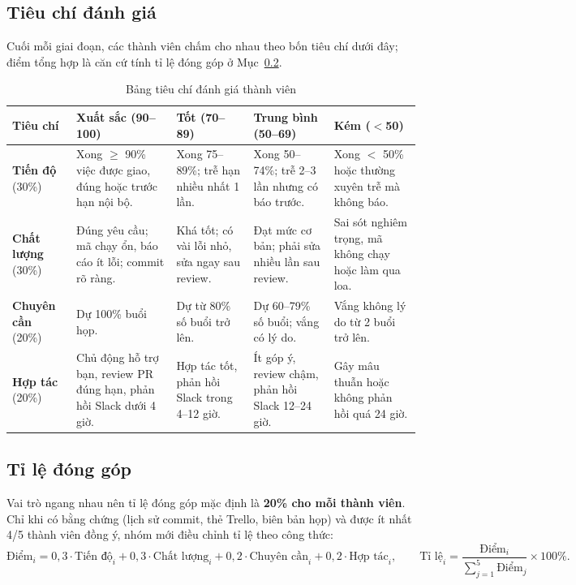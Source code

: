 \documentclass[13pt,a4paper]{extarticle}
\begin{document}
\subsection{Tiêu chí đánh giá}
Cuối mỗi giai đoạn, các thành viên chấm cho nhau theo bốn tiêu chí dưới đây; điểm tổng hợp là căn cứ tính tỉ lệ đóng góp ở Mục~\ref{sec:tile}.

\begin{table}[H]
\centering\footnotesize
\begin{tabularx}{\linewidth}{@{}p{2.1cm} X X X X@{}}
\toprule
\textbf{Tiêu chí} & \textbf{Xuất sắc (90--100)} & \textbf{Tốt (70--89)} & \textbf{Trung bình (50--69)} & \textbf{Kém ($<$50)}\\
\midrule
\textbf{Tiến độ} (30\%) &
Xong $\ge$ 90\% việc được giao, đúng hoặc trước hạn nội bộ. &
Xong 75--89\%; trễ hạn nhiều nhất 1 lần. &
Xong 50--74\%; trễ 2--3 lần nhưng có báo trước. &
Xong $<$ 50\% hoặc thường xuyên trễ mà không báo.\\
\textbf{Chất lượng} (30\%) &
Đúng yêu cầu; mã chạy ổn, báo cáo ít lỗi; commit rõ ràng. &
Khá tốt; có vài lỗi nhỏ, sửa ngay sau review. &
Đạt mức cơ bản; phải sửa nhiều lần sau review. &
Sai sót nghiêm trọng, mã không chạy hoặc làm qua loa.\\
\textbf{Chuyên cần} (20\%) &
Dự 100\% buổi họp. &
Dự từ 80\% số buổi trở lên. &
Dự 60--79\% số buổi; vắng có lý do. &
Vắng không lý do từ 2 buổi trở lên.\\
\textbf{Hợp tác} (20\%) &
Chủ động hỗ trợ bạn, review PR đúng hạn, phản hồi Slack dưới 4 giờ. &
Hợp tác tốt, phản hồi Slack trong 4--12 giờ. &
Ít góp ý, review chậm, phản hồi Slack 12--24 giờ. &
Gây mâu thuẫn hoặc không phản hồi quá 24 giờ.\\
\bottomrule
\end{tabularx}
\caption{Bảng tiêu chí đánh giá thành viên}
\end{table}

\subsection{Tỉ lệ đóng góp}\label{sec:tile}
Vai trò ngang nhau nên tỉ lệ đóng góp mặc định là \textbf{20\% cho mỗi thành viên}. Chỉ khi có bằng chứng (lịch sử commit, thẻ Trello, biên bản họp) và được ít nhất 4/5 thành viên đồng ý, nhóm mới điều chỉnh tỉ lệ theo công thức:
\[
\text{Điểm}_i = 0{,}3\cdot\text{Tiến độ}_i + 0{,}3\cdot\text{Chất lượng}_i + 0{,}2\cdot\text{Chuyên cần}_i + 0{,}2\cdot\text{Hợp tác}_i,
\qquad
\text{Tỉ lệ}_i = \frac{\text{Điểm}_i}{\sum_{j=1}^{5}\text{Điểm}_j}\times 100\%.
\]
\end{document}
